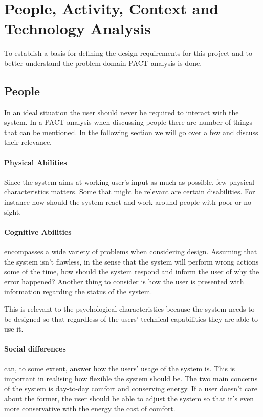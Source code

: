 \section{People, Activity, Context and Technology Analysis}
To establish a basis for defining the design requirements for this project and
to better understand the problem domain PACT analysis is done.

\subsection{People}
In an ideal situation the user should never be required to interact with the system. In a PACT-analysis when discussing people there are number of things that can be mentioned. In the following section we will go over a few and discuss their relevance.

\paragraph{Physical Abilities}
Since the system aims at working user's input as much as possible, few physical characteristics matters. Some that might be relevant are certain disabilities. For instance how should the system react and work around people with poor or no sight.

\paragraph{Cognitive Abilities} encompasses a wide variety of problems
when considering design. Assuming that the system isn't flawless, in the
  sense that the system will perform wrong actions some of the time, how should
the system respond and inform the user of why the error happened? Another thing
to consider is how the user is presented with information regarding the status
of the system.

This is relevant to the psychological characteristics because the system needs to be designed so that regardless of the users' technical capabilities they are able to use it.

\paragraph{Social differences} can, to some extent, answer how the users' usage of
the system is. This is important in realising how flexible the system should be.
The two main concerns of the system is day-to-day comfort and conserving energy.
If a user doesn't care about the former, the user should be able to adjust the system so that it's even more conservative with the energy the cost of comfort.

